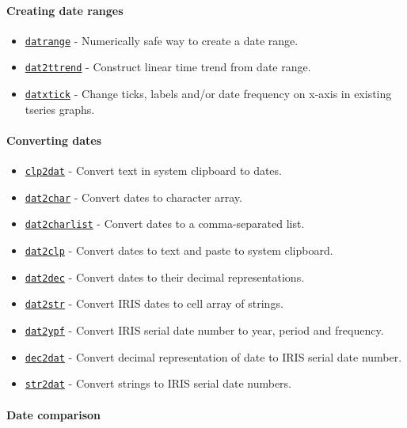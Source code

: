  \paragraph{Creating date ranges}
 
 \begin{itemize}
 \item
   \href{dates/datrange}{\texttt{datrange}} - Numerically safe way to
   create a date range.
 \item
   \href{dates/dat2ttrend}{\texttt{dat2ttrend}} - Construct linear time
   trend from date range.
 \item
   \href{dates/datxtick}{\texttt{datxtick}} - Change ticks, labels and/or
   date frequency on x-axis in existing tseries graphs.
 \end{itemize}
 
 \paragraph{Converting dates}
 
 \begin{itemize}
 \item
   \href{dates/clp2dat}{\texttt{clp2dat}} - Convert text in system
   clipboard to dates.
 \item
   \href{dates/dat2char}{\texttt{dat2char}} - Convert dates to character
   array.
 \item
   \href{dates/dat2charlist}{\texttt{dat2charlist}} - Convert dates to a
   comma-separated list.
 \item
   \href{dates/dat2clp}{\texttt{dat2clp}} - Convert dates to text and
   paste to system clipboard.
 \item
   \href{dates/dat2dec}{\texttt{dat2dec}} - Convert dates to their
   decimal representations.
 \item
   \href{dates/dat2str}{\texttt{dat2str}} - Convert IRIS dates to cell
   array of strings.
 \item
   \href{dates/dat2ypf}{\texttt{dat2ypf}} - Convert IRIS serial date
   number to year, period and frequency.
 \item
   \href{dates/dec2dat}{\texttt{dec2dat}} - Convert decimal
   representation of date to IRIS serial date number.
 \item
   \href{dates/str2dat}{\texttt{str2dat}} - Convert strings to IRIS
   serial date numbers.
 \end{itemize}
 
 \paragraph{Date comparison}
 
